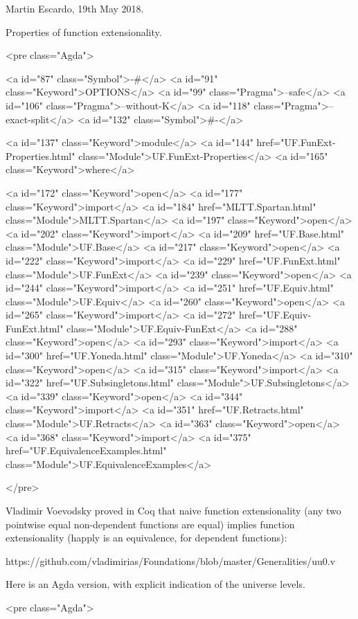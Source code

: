 Martin Escardo, 19th May 2018.

Properties of function extensionality.

<pre class="Agda">

<a id="87" class="Symbol">{-#</a> <a id="91" class="Keyword">OPTIONS</a> <a id="99" class="Pragma">--safe</a> <a id="106" class="Pragma">--without-K</a> <a id="118" class="Pragma">--exact-split</a> <a id="132" class="Symbol">#-}</a>

<a id="137" class="Keyword">module</a> <a id="144" href="UF.FunExt-Properties.html" class="Module">UF.FunExt-Properties</a> <a id="165" class="Keyword">where</a>

<a id="172" class="Keyword">open</a> <a id="177" class="Keyword">import</a> <a id="184" href="MLTT.Spartan.html" class="Module">MLTT.Spartan</a>
<a id="197" class="Keyword">open</a> <a id="202" class="Keyword">import</a> <a id="209" href="UF.Base.html" class="Module">UF.Base</a>
<a id="217" class="Keyword">open</a> <a id="222" class="Keyword">import</a> <a id="229" href="UF.FunExt.html" class="Module">UF.FunExt</a>
<a id="239" class="Keyword">open</a> <a id="244" class="Keyword">import</a> <a id="251" href="UF.Equiv.html" class="Module">UF.Equiv</a>
<a id="260" class="Keyword">open</a> <a id="265" class="Keyword">import</a> <a id="272" href="UF.Equiv-FunExt.html" class="Module">UF.Equiv-FunExt</a>
<a id="288" class="Keyword">open</a> <a id="293" class="Keyword">import</a> <a id="300" href="UF.Yoneda.html" class="Module">UF.Yoneda</a>
<a id="310" class="Keyword">open</a> <a id="315" class="Keyword">import</a> <a id="322" href="UF.Subsingletons.html" class="Module">UF.Subsingletons</a>
<a id="339" class="Keyword">open</a> <a id="344" class="Keyword">import</a> <a id="351" href="UF.Retracts.html" class="Module">UF.Retracts</a>
<a id="363" class="Keyword">open</a> <a id="368" class="Keyword">import</a> <a id="375" href="UF.EquivalenceExamples.html" class="Module">UF.EquivalenceExamples</a>

</pre>

Vladimir Voevodsky proved in Coq that naive function extensionality
(any two pointwise equal non-dependent functions are equal) implies
function extensionality (happly is an equivalence, for dependent
functions):

  https://github.com/vladimirias/Foundations/blob/master/Generalities/uu0.v

Here is an Agda version, with explicit indication of the universe levels.

<pre class="Agda">

